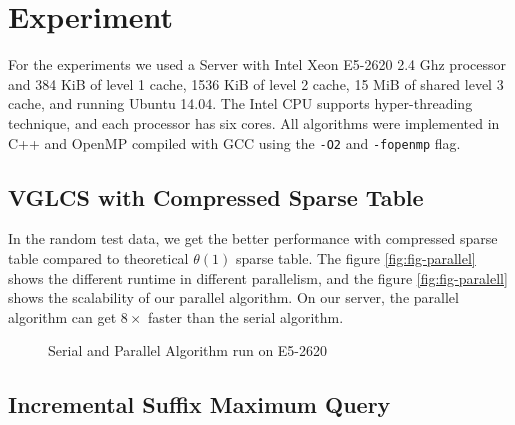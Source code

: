 \section{Experiment}
\label{sec:Experiment}

For the experiments we used a Server with Intel Xeon E5-2620 2.4 Ghz
processor and 384 KiB of level 1 cache, 1536 KiB of level 2 cache, 15
MiB of shared level 3 cache, and running Ubuntu 14.04.  The Intel CPU
supports hyper-threading technique, and each processor has six cores.
All algorithms were implemented in C++ and OpenMP compiled with GCC
using the \texttt{-O2} and \texttt{-fopenmp} flag.

\iffalse
我們運行在 Intel Xeon E5-2620 2.40 GHz 主機上，其擁有 L1 cache 384 KiB、L2 cache 1536 KiB 和 L3 cache 15 MiB，
Intel CPU 同時也支持 hyper-threading 技術，每個處理器有 6 個實體核心。
所有的演算法使用 C++ 和 OpenMP 實作，使用優化參數為 \texttt{-O2} 和 \textt{-fopenmp}。
\fi

\subsection{VGLCS with Compressed Sparse Table}

In the random test data, we get the better performance with compressed
sparse table compared to theoretical $\theta(1)$ sparse table.  The
figure \ref{fig:fig-parallel} shows the different runtime in different
parallelism, and the figure \ref{fig:fig-paralell} shows the
scalability of our parallel algorithm.  On our server, the parallel
algorithm can get $8 \times$ faster than the serial algorithm.

\begin{figure}[!thb]
  \centering
  \caption{Serial and Parallel Algorithm run on E5-2620}
\end{figure}



\subsection{Incremental Suffix Maximum Query}

